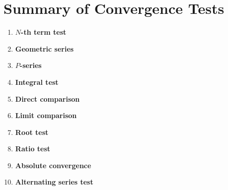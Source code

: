 \documentclass{article}
\begin{document}
\section*{Summary of Convergence Tests}

\begin{enumerate}
\item \textbf{$N$-th term test}
\item \textbf{Geometric series}
\item \textbf{$P$-series}
\item \textbf{Integral test}
\item \textbf{Direct comparison}
\item \textbf{Limit comparison}
\item \textbf{Root test}
\item \textbf{Ratio test}
\item \textbf{Absolute convergence}
\item \textbf{Alternating series test}
\end{enumerate}
\end{document}
